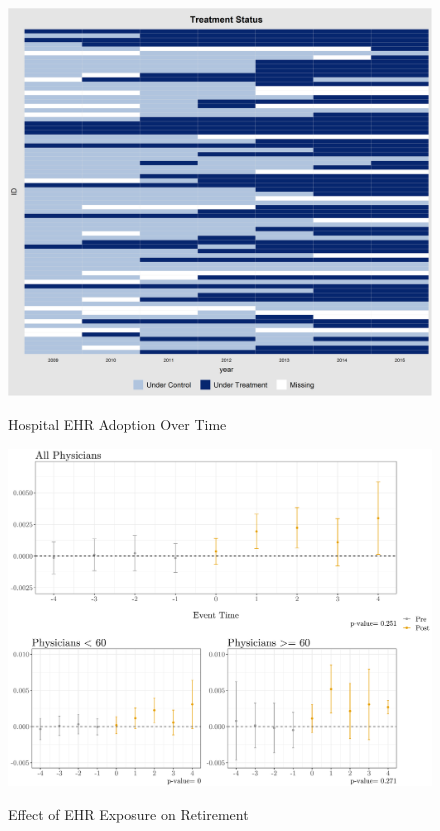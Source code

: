 \documentclass[11pt]{article}
\begin{document}
\begin{figure}
    \centering
    \caption{Hospital EHR Adoption Over Time}
    \includegraphics[scale=.6]{Objects/hosp_treat.png}
    \label{fig:hosp_treat}
\end{figure}

\begin{figure}[p]
    \centering
    \caption{Effect of EHR Exposure on Retirement}
    \includegraphics[scale=.57]{Objects/retire_plot.pdf}
    \label{fig:retirefirst}
\end{figure}
\end{document}
